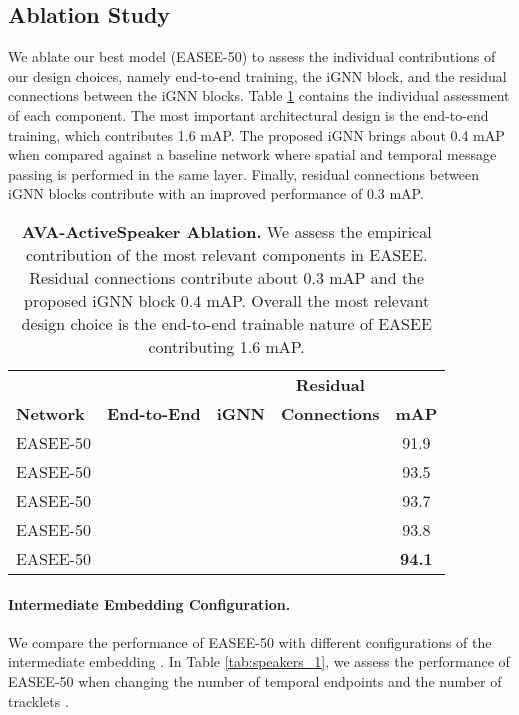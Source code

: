 \documentclass[10pt,twocolumn,letterpaper]{article}
\newcommand{\cmark}{\ding{51}}\newcommand{\xmark}{\ding{55}}
\begin{document}
\subsection{Ablation Study}

We ablate our best model (EASEE-50) to assess the individual contributions of our design choices, namely end-to-end training, the iGNN block, and the residual connections between the iGNN blocks.  Table \ref{tab:ablation} contains the individual assessment of each component. The most important architectural design is the end-to-end training, which contributes 1.6 mAP. The proposed iGNN brings about 0.4 mAP when compared against a baseline network where spatial and temporal message passing is performed in the same layer. Finally, residual connections between iGNN blocks contribute with an improved performance of 0.3 mAP. 
\begin{table}[t]
    \centering
    \small
    \begin{tabular}{ l c c c c }
        \toprule
        & &  \textbf{} & \textbf{Residual} & \\
        \textbf{Network}  & \textbf{End-to-End}  & \textbf{iGNN} & \textbf{ Connections}   &\textbf{mAP} \\
        \midrule
        EASEE-50 & \xmark & \xmark & \xmark & 91.9 \\
        EASEE-50 & \cmark & \xmark & \xmark & 93.5 \\
        EASEE-50 & \cmark & \xmark & \cmark & 93.7 \\
        EASEE-50 & \cmark & \cmark & \xmark & 93.8 \\
        EASEE-50 & \cmark & \cmark & \cmark & \textbf{94.1} \\
        \toprule
    \end{tabular}
    \caption{\textbf{AVA-ActiveSpeaker Ablation.} We assess the empirical contribution of the most relevant components in EASEE. Residual connections contribute about 0.3 mAP and the proposed iGNN block 0.4 mAP. Overall the most relevant design choice is the end-to-end trainable nature of EASEE contributing 1.6 mAP.
    }
    \label{tab:ablation}
\end{table} 
\paragraph{Intermediate Embedding Configuration.}
We compare the performance of EASEE-50 with different  configurations of the intermediate embedding . In Table \ref{tab:speakers_1}, we assess the performance of EASEE-50 when changing the number of temporal endpoints  and the number of tracklets .
\end{document}

